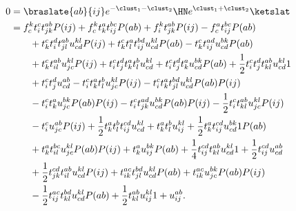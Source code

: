         \begin{align}
            0 & = \braslate{ab}{ij} e^{-\clust_1 - \clust_2} \HN
            e^{\clust_1 + \clust_2}\ketslat
            \\
            &=
            f^{k}_{c} t^{c}_{i} t^{ab}_{jk} P(ij)
            + f^{k}_{c} t^{a}_{k} t^{bc}_{ij} P(ab)
            + f^{k}_{i} t^{ab}_{jk} P(ij)
            - f^{a}_{c} t^{bc}_{ij} P(ab)
            \nonumber \\
            &\qquad
            + t^{c}_{k} t^{d}_{i} t^{ab}_{jl} u^{kl}_{cd} P(ij)
            + t^{c}_{k} t^{a}_{l} t^{bd}_{ij} u^{kl}_{cd} P(ab)
            - t^{c}_{k} t^{ad}_{ij} u^{bk}_{cd} P(ab)
            \nonumber \\
            &\qquad
            + t^{c}_{k} t^{ab}_{il} u^{kl}_{jc} P(ij)
            + t^{c}_{i} t^{d}_{j} t^{a}_{k} t^{b}_{l} u^{kl}_{cd}
            + t^{c}_{i} t^{d}_{j} t^{a}_{k} u^{bk}_{cd} P(ab)
            + \frac{1}{2} t^{c}_{i} t^{d}_{j} t^{ab}_{kl} u^{kl}_{cd} 1
            \nonumber \\
            &\qquad
            + t^{c}_{i} t^{d}_{j} u^{ab}_{cd}
            - t^{c}_{i} t^{a}_{k} t^{b}_{l} u^{kl}_{jc} P(ij)
            - t^{c}_{i} t^{a}_{k} t^{bd}_{jl} u^{kl}_{cd} P(ab) P(ij)
            \nonumber \\
            &\qquad
            - t^{c}_{i} t^{a}_{k} u^{bk}_{jc} P(ab) P(ij)
            - t^{c}_{i} t^{ad}_{jk} u^{bk}_{cd} P(ab) P(ij)
            - \frac{1}{2} t^{c}_{i} t^{ab}_{kl} u^{kl}_{jc} P(ij)
            \nonumber \\
            &\qquad
            - t^{c}_{i} u^{ab}_{jc} P(ij)
            + \frac{1}{2} t^{a}_{k} t^{b}_{l} t^{cd}_{ij} u^{kl}_{cd}
            + t^{a}_{k} t^{b}_{l} u^{kl}_{ij}
            + \frac{1}{2} t^{a}_{k} t^{cd}_{ij} u^{bk}_{cd} 1 P(ab)
            \nonumber \\
            &\qquad
            + t^{a}_{k} t^{bc}_{il} u^{kl}_{jc} P(ab) P(ij)
            + t^{a}_{k} u^{bk}_{ij} P(ab)
            + \frac{1}{4} t^{cd}_{ij} t^{ab}_{kl} u^{kl}_{cd} 1
            + \frac{1}{2} t^{cd}_{ij} u^{ab}_{cd}
            \nonumber \\
            &\qquad
            + \frac{1}{2} t^{cd}_{jk} t^{ab}_{il} u^{kl}_{cd} P(ij)
            + t^{ac}_{ik} t^{bd}_{jl} u^{kl}_{cd} P(ab)
            + t^{ac}_{ik} u^{bk}_{jc} P(ab) P(ij)
            \nonumber \\
            &\qquad
            - \frac{1}{2} t^{ac}_{ij} t^{bd}_{kl} u^{kl}_{cd} P(ab)
            + \frac{1}{2} t^{ab}_{kl} u^{kl}_{ij} 1
            + u^{ab}_{ij}.
        \end{align}

